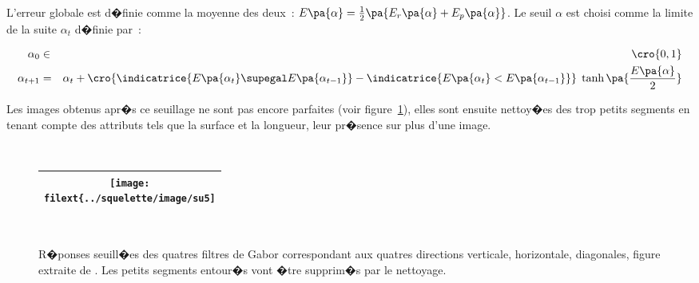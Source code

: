 L'erreur globale est d�finie comme la moyenne des deux~: $E\pa{\alpha} = \frac{1}{2} \pa{ E_r\pa{\alpha} + E_p\pa{\alpha}}$. Le seuil $\alpha$ est choisi comme la limite de la suite $\alpha_t$ d�finie par~:

            \begin{eqnarray}
            \alpha_0           &\in&  \cro{0,1}  \\
            \alpha_{t+1}    &=&        \alpha_t + \cro{ \indicatrice{ E\pa{\alpha_t} \supegal E\pa{\alpha_{t-1}}} - 
                                                                                    \indicatrice{ E\pa{\alpha_t} < E\pa{\alpha_{t-1}}}   }
                                                    \; \tanh \pa{ \frac{ E\pa{\alpha} }{2} }
            \end{eqnarray}            
            
Les images obtenus apr�s ce seuillage ne sont pas encore parfaites (voir figure~\ref{squelette_su_gabor_3}), elles sont ensuite nettoy�es des trop petits segments en tenant compte des attributs tels que la surface et la longueur, leur pr�sence sur plus d'une image.



            \begin{figure}[ht]
        $$\begin{tabular}{|c|}\hline
        \texttt{[image: \\filext\{../squelette/image/su5]}} 
        \\ \hline \end{tabular}$$
        \caption{    R�ponses seuill�es des quatres filtres de Gabor 
                            correspondant aux quatres directions verticale, horizontale,
                            diagonales, figure extraite de . 
                            Les petits segments entour�s vont �tre supprim�s par le nettoyage.}
        \label{squelette_su_gabor_3}
            \end{figure}































